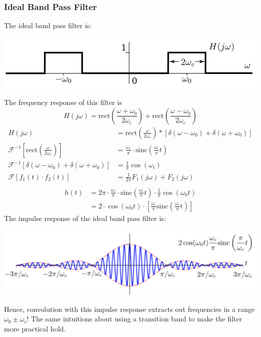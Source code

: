 \documentclass[10pt]{article}
\newcommand{\sinc}{\text{sinc}}
\newcommand{\rect}{\text{rect}}
\newcommand{\fourier}{\mathcal{F}}
\begin{document}
\subsubsection*{Ideal Band Pass Filter}
The ideal band pass filter is:
\begin{center}
    \includegraphics[width=\textwidth]{W7_8.png}
\end{center}
The frequency response of this filter is
\[H(j\omega) = \rect\left(\frac{\omega + \omega_0}{2\omega_c}\right) + \rect\left(\frac{\omega - \omega_0}{2\omega_c}\right)\]
\begin{align*}
    H(j\omega) &= \rect\left(\frac{\omega}{2\omega_c}\right) * \left[\delta(\omega - \omega_0) + \delta(\omega + \omega_0)\right]\\
    \fourier^{-1}\left[\rect\left(\frac{\omega}{2\omega_c}\right)\right] &= \frac{\omega_c}{\pi} \cdot \sinc\left(\frac{\omega_c}{\pi} t\right)\\
    \fourier^{-1}\left[\delta(\omega - \omega_0) + \delta(\omega + \omega_0)\right] &= \frac{1}{\pi} \cos(\omega_t)\\
    \fourier\left[f_1(t) \cdot f_2(t)\right] &= \frac{1}{2\pi} F_1(j\omega) + F_2(j\omega)\\
\end{align*}
\begin{align*}
    h(t) &= 2\pi \cdot \frac{\omega_c}{\pi} \cdot \sinc\left(\frac{\omega_c}{\pi}t\right) \cdot \frac{1}{\pi} \cos(\omega_0 t)\\
    &= 2 \cdot \cos(\omega_0 t) \cdot \left[\frac{\omega_c}{\pi} \sinc\left(\frac{\omega_c}{\pi}t\right)\right]
\end{align*}
The impulse response of the ideal band pass filter is:
\begin{center}
    \includegraphics[width=\textwidth]{W7_9.png}
\end{center}
Hence, convolution with this impulse response extracts out frequencies in a range $\omega_0 \pm \omega_c$!  The same intuitions about using a transition band to make the filter more practical hold.
\end{document}
